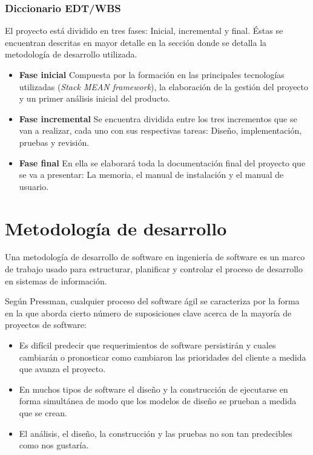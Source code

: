 \subsubsection{Diccionario EDT/WBS}
El proyecto está dividido en tres fases: Inicial, incremental y final. Éstas se encuentran descritas en mayor detalle en la sección donde se detalla la metodología de desarrollo utilizada.

\begin{itemize}[label={}]
\item \textbf{Fase inicial}
Compuesta por la formación en las principales tecnologías utilizadas (\textit{Stack MEAN framework}), la elaboración de la gestión del proyecto y un primer análisis inicial del producto.
\item \textbf{Fase incremental}
Se encuentra dividida entre los tres incrementos que se van a realizar, cada uno con sus respectivas tareas: Diseño, implementación, pruebas y revisión.
\item \textbf{Fase final}
En ella se elaborará toda la documentación final del proyecto que se va a presentar: La memoria, el manual de instalación y el manual de usuario.
\end{itemize} 


\section{Metodología de desarrollo}
Una metodología de desarrollo de software en ingeniería de software es un marco de trabajo usado para estructurar, planificar y controlar el proceso de desarrollo en sistemas de información.


Según Pressman\cite{pressman}, cualquier proceso del software ágil se caracteriza por la forma en la que aborda cierto número de suposiciones clave acerca de la mayoría de proyectos de software:

\begin{itemize}
\item Es difícil predecir que requerimientos de software persistirán y cuales cambiarán o pronosticar como cambiaron las prioridades del cliente a medida que avanza el proyecto.
\item En muchos tipos de software el diseño y la construcción de ejecutarse en forma simultánea de modo que los modelos de diseño se prueban a medida que se crean.
\item El análisis, el diseño, la construcción y las pruebas no son tan predecibles como nos gustaría.
\end{itemize} 


